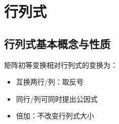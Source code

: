 
\chapter{行列式}

\section{行列式基本概念与性质}

\begin{theorem}[行列式初等变换]
  矩阵初等变换相对行列式的变换为：
  \begin{itemize}
  \item 互换两行/列：取反号
  \item 同行/列可同时提出公因式
  \item 倍加：不改变行列式大小
  \end{itemize}
\end{theorem}

